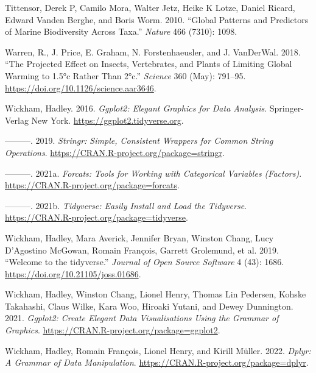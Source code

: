 \documentclass[
]{book}
\newlength{\cslhangindent}
\newlength{\cslentryspacingunit} %
\newenvironment{CSLReferences}[2] %
 {%
  \setlength{\parindent}{0pt}
  \ifodd #1
  \let\oldpar\par
  \def\par{\hangindent=\cslhangindent\oldpar}
  \fi
  \setlength{\parskip}{#2\cslentryspacingunit}
 }%
 {}
\begin{document}
\begin{CSLReferences}{1}{0}
\leavevmode{}%
Tittensor, Derek P, Camilo Mora, Walter Jetz, Heike K Lotze, Daniel Ricard, Edward Vanden Berghe, and Boris Worm. 2010. {``Global Patterns and Predictors of Marine Biodiversity Across Taxa.''} \emph{Nature} 466 (7310): 1098.

\leavevmode{}%
Warren, R., J. Price, E. Graham, N. Forstenhaeusler, and J. VanDerWal. 2018. {``The Projected Effect on Insects, Vertebrates, and Plants of Limiting Global Warming to 1.5°c Rather Than 2°c.''} \emph{Science} 360 (May): 791--95. \url{https://doi.org/10.1126/science.aar3646}.

\leavevmode{}%
Wickham, Hadley. 2016. \emph{Ggplot2: Elegant Graphics for Data Analysis}. Springer-Verlag New York. \url{https://ggplot2.tidyverse.org}.

\leavevmode{}%
---------. 2019. \emph{Stringr: Simple, Consistent Wrappers for Common String Operations}. \url{https://CRAN.R-project.org/package=stringr}.

\leavevmode{}%
---------. 2021a. \emph{Forcats: Tools for Working with Categorical Variables (Factors)}. \url{https://CRAN.R-project.org/package=forcats}.

\leavevmode{}%
---------. 2021b. \emph{Tidyverse: Easily Install and Load the Tidyverse}. \url{https://CRAN.R-project.org/package=tidyverse}.

\leavevmode{}%
Wickham, Hadley, Mara Averick, Jennifer Bryan, Winston Chang, Lucy D'Agostino McGowan, Romain François, Garrett Grolemund, et al. 2019. {``Welcome to the {tidyverse}.''} \emph{Journal of Open Source Software} 4 (43): 1686. \url{https://doi.org/10.21105/joss.01686}.

\leavevmode{}%
Wickham, Hadley, Winston Chang, Lionel Henry, Thomas Lin Pedersen, Kohske Takahashi, Claus Wilke, Kara Woo, Hiroaki Yutani, and Dewey Dunnington. 2021. \emph{Ggplot2: Create Elegant Data Visualisations Using the Grammar of Graphics}. \url{https://CRAN.R-project.org/package=ggplot2}.

\leavevmode{}%
Wickham, Hadley, Romain François, Lionel Henry, and Kirill Müller. 2022. \emph{Dplyr: A Grammar of Data Manipulation}. \url{https://CRAN.R-project.org/package=dplyr}.


\end{CSLReferences}
\end{document}
